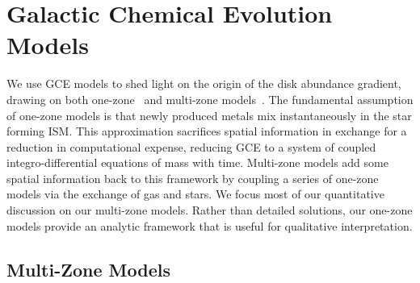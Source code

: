 
\section{Galactic Chemical Evolution Models}
\label{outflows:sec:gce}
We use GCE models to shed light on the origin of the disk abundance gradient,
drawing on both one-zone~\citep[e.g.,][]{Tinsley1980, Pagel2009, Matteucci2021}
and multi-zone models~\citep[e.g.,][]{Schoenrich2009a, Minchev2013,
Minchev2014, Chen2023}.
The fundamental assumption of one-zone models is that newly produced metals
mix instantaneously in the star forming ISM.
This approximation sacrifices spatial information in exchange for a reduction
in computational expense, reducing GCE to a system of coupled
integro-differential equations of mass with time.
Multi-zone models add some spatial information back to this framework by
coupling a series of one-zone models via the exchange of gas and stars.
We focus most of our quantitative discussion on our multi-zone models.
Rather than detailed solutions, our one-zone models provide an analytic
framework that is useful for qualitative interpretation.



\subsection{Multi-Zone Models}
\label{outflows:sec:gce:multizone}

